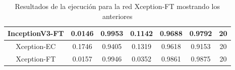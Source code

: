 \documentclass[11pt,a4paper]{article}
\theoremstyle{definition}
\begin{document}
\begin{table}[H]
\begin{tabular}{|c|c|c|c|c|c|c|}
\hline
InceptionV3-FT                                      & \textcolor[rgb]{0.129,0.129,0.129}{0.0146 } & \textcolor[rgb]{0.129,0.129,0.129}{0.9953 } & \textcolor[rgb]{0.129,0.129,0.129}{0.1142 }                                                                       & \textcolor[rgb]{0.129,0.129,0.129}{0.9688}                                                                             & \textcolor[rgb]{0.129,0.129,0.129}{0.9792}                                                                       & 20                                                                                                              \\
\hline
Xception-EC                                            & \textcolor[rgb]{0.129,0.129,0.129}{0.1746 } & \textcolor[rgb]{0.129,0.129,0.129}{0.9405 } & \textcolor[rgb]{0.129,0.129,0.129}{0.1319 }                                                                       & \textcolor[rgb]{0.129,0.129,0.129}{0.9618}                                                                             & \textcolor[rgb]{0.129,0.129,0.129}{0.9153}                                                                       & 20                                                                                                              \\
\hline
\rowcolor{green} Xception-FT                        & \textcolor[rgb]{0.129,0.129,0.129}{0.0157 } & \textcolor[rgb]{0.129,0.129,0.129}{0.9946 } & \textcolor[rgb]{0.129,0.129,0.129}{0.0352 }                                                                       & \textcolor[rgb]{0.129,0.129,0.129}{0.9861}                                                                             & \textcolor[rgb]{0.129,0.129,0.129}{0.9875}                                                                       & 20                                                                                                              \\
\hline
\end{tabular}
\caption{Resultados de la ejecución para la red Xception-FT mostrando los anteriores}
\end{table}
\end{document}

